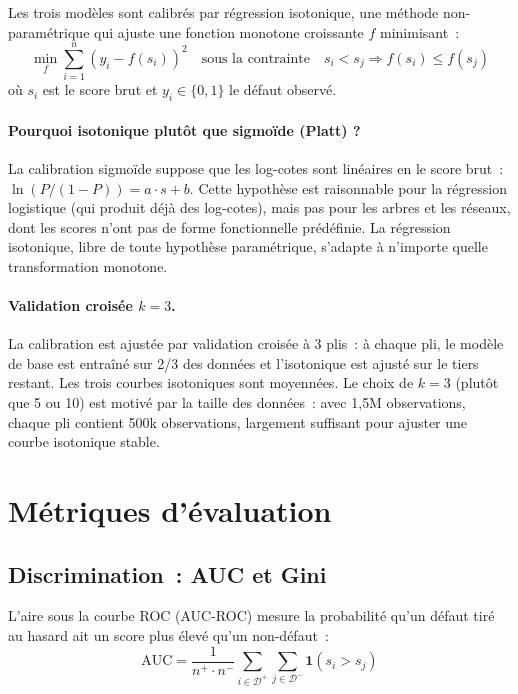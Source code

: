 \documentclass[12pt, a4paper, twoside, openright]{report}
\theoremstyle{definition}
\begin{document}
Les trois modèles sont calibrés par régression isotonique, une méthode non-paramétrique qui ajuste une fonction monotone croissante $f$ minimisant~:
\begin{equation}
\min_f \sum_{i=1}^{n} (y_i - f(s_i))^2 \quad \text{sous la contrainte} \quad s_i < s_j \Rightarrow f(s_i) \leq f(s_j)
\label{eq:isotonic}
\end{equation}
où $s_i$ est le score brut et $y_i \in \{0, 1\}$ le défaut observé.

\paragraph{Pourquoi isotonique plutôt que sigmoïde (Platt) ?} La calibration sigmoïde suppose que les log-cotes sont linéaires en le score brut~: $\ln(P/(1-P)) = a \cdot s + b$. Cette hypothèse est raisonnable pour la régression logistique (qui produit déjà des log-cotes), mais pas pour les arbres et les réseaux, dont les scores n'ont pas de forme fonctionnelle prédéfinie. La régression isotonique, libre de toute hypothèse paramétrique, s'adapte à n'importe quelle transformation monotone.

\paragraph{Validation croisée $k = 3$.} La calibration est ajustée par validation croisée à 3 plis~: à chaque pli, le modèle de base est entraîné sur 2/3 des données et l'isotonique est ajusté sur le tiers restant. Les trois courbes isotoniques sont moyennées. Le choix de $k = 3$ (plutôt que 5 ou 10) est motivé par la taille des données~: avec 1{,}5M observations, chaque pli contient 500k observations, largement suffisant pour ajuster une courbe isotonique stable.

\section{Métriques d'évaluation}
\label{sec:pd:metriques}

\subsection{Discrimination~: AUC et Gini}

L'aire sous la courbe ROC (AUC-ROC) mesure la probabilité qu'un défaut tiré au hasard ait un score plus élevé qu'un non-défaut~:
\begin{equation}
\text{AUC} = \frac{1}{n^+ \cdot n^-} \sum_{i \in \mathcal{D}^+} \sum_{j \in \mathcal{D}^-} \mathbf{1}(s_i > s_j)
\label{eq:auc}
\end{equation}
\end{document}
